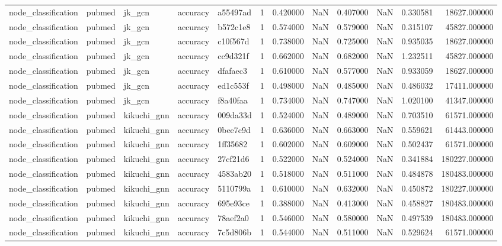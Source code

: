 \begin{tabular}{lllllrrrrrrr}
node_classification & pubmed & jk_gcn & accuracy & a55497ad & 1 & 0.420000 & NaN & 0.407000 & NaN & 0.330581 & 18627.000000 \\
node_classification & pubmed & jk_gcn & accuracy & b572c1e8 & 1 & 0.574000 & NaN & 0.579000 & NaN & 0.315107 & 45827.000000 \\
node_classification & pubmed & jk_gcn & accuracy & c10f567d & 1 & 0.738000 & NaN & 0.725000 & NaN & 0.935035 & 18627.000000 \\
node_classification & pubmed & jk_gcn & accuracy & cc9d321f & 1 & 0.662000 & NaN & 0.682000 & NaN & 1.232511 & 45827.000000 \\
node_classification & pubmed & jk_gcn & accuracy & dfafaec3 & 1 & 0.610000 & NaN & 0.577000 & NaN & 0.933059 & 18627.000000 \\
node_classification & pubmed & jk_gcn & accuracy & ed1c553f & 1 & 0.498000 & NaN & 0.485000 & NaN & 0.486032 & 17411.000000 \\
node_classification & pubmed & jk_gcn & accuracy & f8a40faa & 1 & 0.734000 & NaN & 0.747000 & NaN & 1.020100 & 41347.000000 \\
node_classification & pubmed & kikuchi_gnn & accuracy & 009da33d & 1 & 0.524000 & NaN & 0.489000 & NaN & 0.703510 & 61571.000000 \\
node_classification & pubmed & kikuchi_gnn & accuracy & 0bee7c9d & 1 & 0.636000 & NaN & 0.663000 & NaN & 0.559621 & 61443.000000 \\
node_classification & pubmed & kikuchi_gnn & accuracy & 1ff35682 & 1 & 0.602000 & NaN & 0.609000 & NaN & 0.502437 & 61571.000000 \\
node_classification & pubmed & kikuchi_gnn & accuracy & 27cf21d6 & 1 & 0.522000 & NaN & 0.524000 & NaN & 0.341884 & 180227.000000 \\
node_classification & pubmed & kikuchi_gnn & accuracy & 4583ab20 & 1 & 0.518000 & NaN & 0.511000 & NaN & 0.484878 & 180483.000000 \\
node_classification & pubmed & kikuchi_gnn & accuracy & 5110799a & 1 & 0.610000 & NaN & 0.632000 & NaN & 0.450872 & 180227.000000 \\
node_classification & pubmed & kikuchi_gnn & accuracy & 695e93ce & 1 & 0.388000 & NaN & 0.413000 & NaN & 0.458827 & 180483.000000 \\
node_classification & pubmed & kikuchi_gnn & accuracy & 78aef2a0 & 1 & 0.546000 & NaN & 0.580000 & NaN & 0.497539 & 180483.000000 \\
node_classification & pubmed & kikuchi_gnn & accuracy & 7c5d806b & 1 & 0.544000 & NaN & 0.511000 & NaN & 0.529624 & 61571.000000 \\

\end{tabular}
